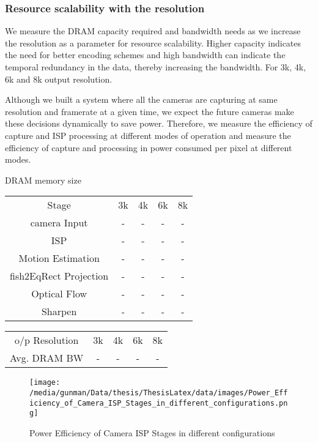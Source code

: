 \subsubsection{Resource scalability with the resolution}
We measure the DRAM capacity required and bandwidth needs as we increase the resolution as a parameter for resource scalability. Higher capacity indicates the need for better encoding schemes and high bandwidth can indicate the temporal redundancy in the data, thereby increasing the bandwidth. For 3k, 4k, 6k and 8k output resolution.

Although we built a system where all the cameras are capturing at same resolution and framerate at a given time, we expect the future cameras make these decisions dynamically to save power. Therefore, we  measure the efficiency of capture and ISP processing at different modes of operation and measure the efficiency of capture and processing in power consumed per pixel at different modes.

DRAM memory size\newline
\begin{tabular}{c|c|c|c|c}
	Stage & 3k & 4k & 6k & 8k \\
	camera Input & - & - & - & - \\
	ISP & - & - & - & - \\
	Motion Estimation & - & - & - & - \\
	fish2EqRect Projection & - & - & - & - \\
	Optical Flow & - & - & - & - \\
	Sharpen & - & - & - & - \\
\end{tabular} 

\vspace{10mm}
\begin{tabular}{c|c|c|c|c}
	o/p Resolution & 3k & 4k & 6k & 8k \\
	Avg. DRAM BW & - & - & - & - \\
\end{tabular} 
\vspace{30mm}

\begin{figure*}
	\begin{center}
		\texttt{[image: /media/gunman/Data/thesis/ThesisLatex/data/images/Power\_Efficiency\_of\_Camera\_ISP\_Stages\_in\_different\_configurations.png]}
		\caption{Power Efficiency of Camera ISP Stages in different configurations}
		\label{fig:ex_4_9}
	\end{center}
	\vspace{-0.3in}
\end{figure*} 


